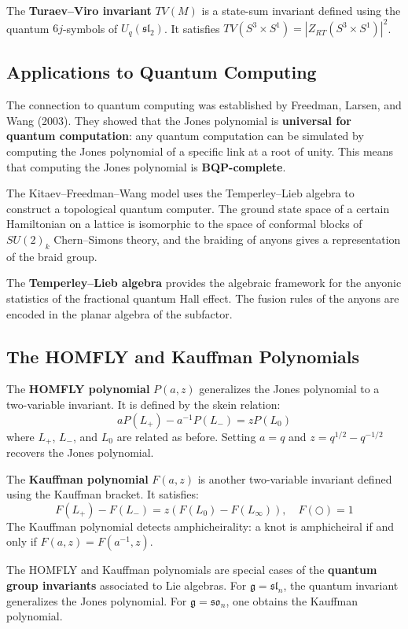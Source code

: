The \textbf{Turaev--Viro invariant} $TV(M)$ is a state-sum invariant defined using the quantum $6j$-symbols of $U_q(\mathfrak{sl}_2)$. It satisfies $TV(S^3 \times S^1) = |Z_{RT}(S^3 \times S^1)|^2$.

\subsection*{Applications to Quantum Computing}

The connection to quantum computing was established by Freedman, Larsen, and Wang (2003). They showed that the Jones polynomial is \textbf{universal for quantum computation}: any quantum computation can be simulated by computing the Jones polynomial of a specific link at a root of unity. This means that computing the Jones polynomial is \textbf{BQP-complete}.

The Kitaev--Freedman--Wang model uses the Temperley--Lieb algebra to construct a topological quantum computer. The ground state space of a certain Hamiltonian on a lattice is isomorphic to the space of conformal blocks of $SU(2)_k$ Chern--Simons theory, and the braiding of anyons gives a representation of the braid group.

The \textbf{Temperley--Lieb algebra} provides the algebraic framework for the anyonic statistics of the fractional quantum Hall effect. The fusion rules of the anyons are encoded in the planar algebra of the subfactor.

\subsection*{The HOMFLY and Kauffman Polynomials}

The \textbf{HOMFLY polynomial} $P(a, z)$ generalizes the Jones polynomial to a two-variable invariant. It is defined by the skein relation:
\[
a P(L_+) - a^{-1} P(L_-) = z P(L_0)
\]
where $L_+$, $L_-$, and $L_0$ are related as before. Setting $a = q$ and $z = q^{1/2} - q^{-1/2}$ recovers the Jones polynomial.

The \textbf{Kauffman polynomial} $F(a, z)$ is another two-variable invariant defined using the Kauffman bracket. It satisfies:
\[
F(L_+) - F(L_-) = z(F(L_0) - F(L_\infty)), \quad F(\bigcirc) = 1
\]
The Kauffman polynomial detects amphicheirality: a knot is amphicheiral if and only if $F(a, z) = F(a^{-1}, z)$.

The HOMFLY and Kauffman polynomials are special cases of the \textbf{quantum group invariants} associated to Lie algebras. For $\mathfrak{g} = \mathfrak{sl}_n$, the quantum invariant generalizes the Jones polynomial. For $\mathfrak{g} = \mathfrak{so}_n$, one obtains the Kauffman polynomial.

